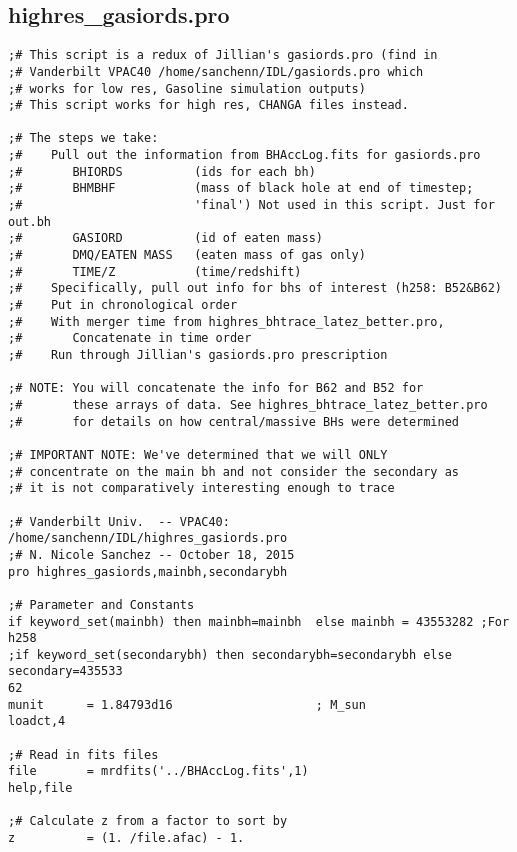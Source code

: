 \documentclass[12pt,headA,chapB]{fiskthesis}
\begin{document}
\subsection{highres\_gasiords.pro}
\begin{verbatim}
;# This script is a redux of Jillian's gasiords.pro (find in
;# Vanderbilt VPAC40 /home/sanchenn/IDL/gasiords.pro which
;# works for low res, Gasoline simulation outputs) 
;# This script works for high res, CHANGA files instead. 

;# The steps we take:
;#    Pull out the information from BHAccLog.fits for gasiords.pro
;#       BHIORDS          (ids for each bh)
;#       BHMBHF           (mass of black hole at end of timestep;
;#                        'final') Not used in this script. Just for out.bh
;#       GASIORD          (id of eaten mass)
;#       DMQ/EATEN MASS   (eaten mass of gas only)
;#       TIME/Z           (time/redshift)
;#    Specifically, pull out info for bhs of interest (h258: B52&B62)
;#    Put in chronological order
;#    With merger time from highres_bhtrace_latez_better.pro,
;#       Concatenate in time order
;#    Run through Jillian's gasiords.pro prescription

;# NOTE: You will concatenate the info for B62 and B52 for 
;#       these arrays of data. See highres_bhtrace_latez_better.pro 
;#       for details on how central/massive BHs were determined

;# IMPORTANT NOTE: We've determined that we will ONLY
;# concentrate on the main bh and not consider the secondary as
;# it is not comparatively interesting enough to trace

;# Vanderbilt Univ.  -- VPAC40:  /home/sanchenn/IDL/highres_gasiords.pro
;# N. Nicole Sanchez -- October 18, 2015
pro highres_gasiords,mainbh,secondarybh
  
;# Parameter and Constants 
if keyword_set(mainbh) then mainbh=mainbh  else mainbh = 43553282 ;For h258
;if keyword_set(secondarybh) then secondarybh=secondarybh else secondary=435533
62
munit      = 1.84793d16                    ; M_sun
loadct,4

;# Read in fits files
file       = mrdfits('../BHAccLog.fits',1)
help,file

;# Calculate z from a factor to sort by
z          = (1. /file.afac) - 1.


\end{verbatim}
\end{document}
